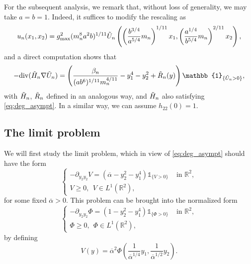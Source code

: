 \documentclass[10pt,a4paper]{article}
\newcommand{\gmax}{g_{\mathrm{max}}}
\newcommand{\RR}{\mathbb{R}}
\newcommand{\divg}{\mathrm{div}}
\numberwithin{equation}{section}
\begin{document}
For the subsequent analysis, we remark that, without loss of generality, we may take $ a = b = 1 $. Indeed, it suffices to modify the rescaling as
\[u_n(x_1, x_2) = \gmax^2 (m_n^{8} a^{2}b)^{1/11} \Tilde{U}_n\left( \left( \frac{b^{3/4}}{a^{5/4}}m_n \right)^{1/11} x_1, \left( \frac{a^{1/4}}{b^{5/4}}m_n \right)^{2/11} x_2  \right), \]
and a direct computation shows that 
\[-\divg(\Tilde{H}_n \nabla \Tilde{U}_n) = \left( \frac{\beta_n}{(ab^{6})^{1/11} m_n^{4/11}} - y_1^{4} - y_2^{2} + \Tilde{R}_n(y) \right)\mathbb{1}_{\{\Tilde{U}_n > 0\}}, \]
with $ \Tilde{H}_n $, $ \Tilde{R}_n $ defined in an analogous way, and $ \Tilde{H}_n $ also satisfying \eqref{eq:deg_asympt}. In a similar way, we can assume $ h_{22}(0) = 1 $. 

\subsection{The limit problem}
\label{ssect:limit_deg}

We will first study the limit problem, which in view of \eqref{eq:deg_asympt} should have the form 
\begin{equation}
	\label{eq:deg_limit_prob}
	\begin{cases}
		- \partial_{y_2 y_2 } V = \left( \overline{\alpha} - y_2^{2} - y_1^{4} \right) \mathbb{1}_{\{V>0\}} & \text{ in } \RR^{2}, \\ 
		V \geq 0, ~~ V \in L^{1}(\RR^{2}),
	\end{cases}
\end{equation}
for some fixed $ \overline{\alpha} > 0 $. This problem can be brought into the normalized form 
\begin{equation}
\label{eq:limit_deg}
\begin{cases}
	- \partial_{y_2 y_2 } \Phi = \left( 1 - y_2^{2} - y_1^{4} \right) \mathbb{1}_{\{\Phi>0\}} & \text{ in } \RR^{2}, \\ 
	\Phi \geq 0, ~~ \Phi \in L^{1}(\RR^{2}),
\end{cases}
\end{equation}
by defining
\begin{equation}
	\label{eq:deg_V}
	V(y) = \overline{\alpha}^{2} \Phi \left( \frac{1}{\overline{\alpha}^{1/4}} y_1, \frac{1}{\overline{\alpha}^{1/2}} y_2 \right).
\end{equation}
\end{document}
